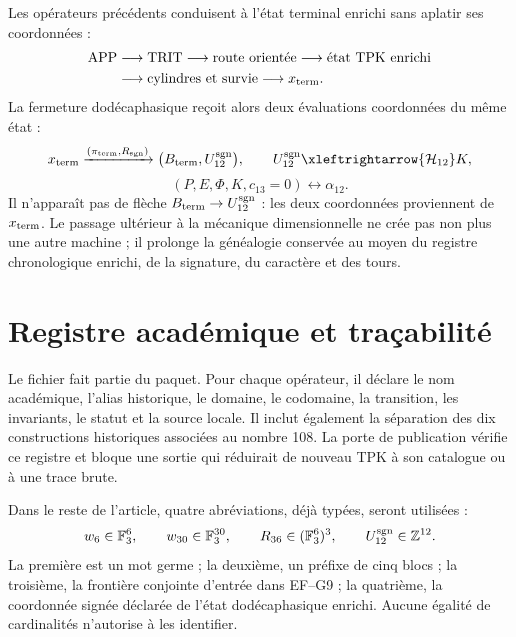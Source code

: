 Les opérateurs précédents conduisent à l'état terminal enrichi sans
aplatir ses coordonnées :
\[
 \begin{aligned}
 \mathrm{APP}&\longrightarrow\mathrm{TRIT}
 \longrightarrow\text{route orientée}
 \longrightarrow\text{état TPK enrichi}\\
 &\longrightarrow\text{cylindres et survie}
 \longrightarrow x_{\rm term}.
 \end{aligned}
\]
La fermeture dodécaphasique reçoit alors deux évaluations coordonnées du même
état :
\[
 x_{\rm term}
 \xrightarrow{(\pi_{\rm term},R_{\rm sgn})}
 \bigl(B_{\rm term},U_{12}^{\rm sgn}\bigr),
 \qquad
 U_{12}^{\rm sgn}\xleftrightarrow{\mathcal H_{12}}K,
\]
\[
 (P,E,\Phi,K,c_{13}=0)\longleftrightarrow\alpha_{12}.
\]
Il n'apparaît pas de flèche \(B_{\rm term}\to U_{12}^{\rm sgn}\) : les deux
coordonnées proviennent de \(x_{\rm term}\). Le passage ultérieur à la mécanique
dimensionnelle ne crée pas non plus une autre machine ; il prolonge la généalogie conservée
au moyen du registre chronologique enrichi, de la signature, du caractère et des tours.

\ifdefined\HMTInternalTraceability
\section{Registre académique et traçabilité}

Le fichier  fait partie du paquet.
Pour chaque opérateur, il déclare le nom académique, l'alias historique, le domaine,
le codomaine, la transition, les invariants, le statut et la source locale. Il inclut également
la séparation des dix constructions historiques associées au nombre
108. La porte de publication vérifie ce registre et bloque une sortie
qui réduirait de nouveau TPK à son catalogue ou à une trace brute.

Dans le reste de l'article, quatre abréviations, déjà typées, seront utilisées :
\[
 w_6\in\mathbb F_3^6,\qquad
 w_{30}\in\mathbb F_3^{30},\qquad
 R_{36}\in(\mathbb F_3^6)^3,\qquad
 U_{12}^{\rm sgn}\in\mathbb Z^{12}.
\]
La première est un mot germe ; la deuxième, un préfixe de cinq blocs ;
 la troisième, la frontière conjointe d'entrée dans EF--G9 ; la quatrième, la
coordonnée signée déclarée de l'état dodécaphasique enrichi. Aucune égalité de cardinalités n'autorise à
les identifier.
\fi
